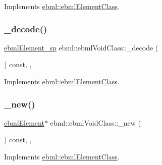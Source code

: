 Implements \mbox{\hyperlink{classebml_1_1ebmlElementClass_aa6bf675de4918fd7b553d141871a2ede}{ebml\+::ebml\+Element\+Class}}.

\mbox{\label{classebml_1_1ebmlVoidClass_a4b4b65f2289a5f4cbd182dac7b5aa1db}} 
\subsubsection{\texorpdfstring{\+\_\+decode()}{\_decode()}\hspace{0.1cm}{\footnotesize\ttfamily [2/2]}}
{\footnotesize\ttfamily \mbox{\hyperlink{namespaceebml_adad533b7705a16bb360fe56380c5e7be}{ebml\+Element\+\_\+sp}} ebml\+::ebml\+Void\+Class\+::\+\_\+decode (\begin{DoxyParamCaption}\item[{const \mbox{\hyperlink{classebml_1_1parseFile}{parse\+File}} \&}]{ }\end{DoxyParamCaption}) const\hspace{0.3cm}{\ttfamily [override]}, {\ttfamily [protected]}, {\ttfamily [virtual]}}



Implements \mbox{\hyperlink{classebml_1_1ebmlElementClass_aedbfff5909af215acaa3ca28643f1bc9}{ebml\+::ebml\+Element\+Class}}.

\mbox{\label{classebml_1_1ebmlVoidClass_a3403a8145594a3ce5e34b02dd2f938ae}} 
\subsubsection{\texorpdfstring{\+\_\+new()}{\_new()}}
{\footnotesize\ttfamily \mbox{\hyperlink{classebml_1_1ebmlElement}{ebml\+Element}}$\ast$ ebml\+::ebml\+Void\+Class\+::\+\_\+new (\begin{DoxyParamCaption}{ }\end{DoxyParamCaption}) const\hspace{0.3cm}{\ttfamily [override]}, {\ttfamily [protected]}, {\ttfamily [virtual]}}



Implements \mbox{\hyperlink{classebml_1_1ebmlElementClass_a223ede6b8bc3c85251d2d73f0256fb45}{ebml\+::ebml\+Element\+Class}}.

